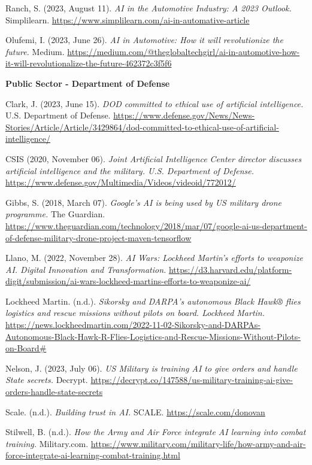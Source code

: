 \documentclass[
]{article}
\begin{document}
Ranch, S. (2023, August 11). \emph{AI in the Automotive Industry: A 2023 Outlook.} Simplilearn. \url{https://www.simplilearn.com/ai-in-automative-article}

Olufemi, I. (2023, June 26). \emph{AI in Automotive: How it will revolutionize the future.} Medium. \url{https://medium.com/@theglobaltechgirl/ai-in-automotive-how-it-will-revolutionalize-the-future-462372c3f5f6}

\textbf{Public Sector - Department of Defense}

Clark, J. (2023, June 15). \emph{DOD committed to ethical use of artificial intelligence.} U.S. Department of Defense. \url{https://www.defense.gov/News/News-Stories/Article/Article/3429864/dod-committed-to-ethical-use-of-artificial-intelligence/}

CSIS (2020, November 06). \emph{Joint Artificial Intelligence Center director discusses artificial intelligence and the military. U.S. Department of Defense.} \url{https://www.defense.gov/Multimedia/Videos/videoid/772012/}

Gibbs, S. (2018, March 07). \emph{Google's AI is being used by US military drone programme.} The Guardian. \url{https://www.theguardian.com/technology/2018/mar/07/google-ai-us-department-of-defense-military-drone-project-maven-tensorflow}

Llano, M. (2022, November 28). \emph{AI Wars: Lockheed Martin's efforts to weaponize AI. Digital Innovation and Transformation.} \url{https://d3.harvard.edu/platform-digit/submission/ai-wars-lockheed-martins-efforts-to-weaponize-ai/}

Lockheed Martin. (n.d.). \emph{Sikorsky and DARPA's autonomous Black Hawk® flies logistics and rescue missions without pilots on board. Lockheed Martin.} \url{https://news.lockheedmartin.com/2022-11-02-Sikorsky-and-DARPAs-Autonomous-Black-Hawk-R-Flies-Logistics-and-Rescue-Missions-Without-Pilots-on-Board\#}

Nelson, J. (2023, July 06). \emph{US Military is training AI to give orders and handle State secrets.} Decrypt. \url{https://decrypt.co/147588/us-military-training-ai-give-orders-handle-state-secrets}

Scale. (n.d.). \emph{Building trust in AI.} SCALE. \url{https://scale.com/donovan}

Stilwell, B. (n.d.). \emph{How the Army and Air Force integrate AI learning into combat training.} Military.com. \url{https://www.military.com/military-life/how-army-and-air-force-integrate-ai-learning-combat-training.html}
\end{document}
